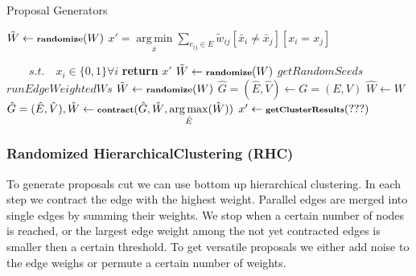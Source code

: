 \documentclass[10pt,twocolumn,letterpaper]{article}
\DeclareMathOperator*{\argmin}{arg\,min}
\DeclareMathOperator*{\argmax}{arg\,max}
\begin{document}
\begin{algorithm}
    \begin{scriptsize}
        \caption{Proposal Generators}\label{alg:proposal_gen}   
        \begin{algorithmic}[1]
            \State $\tilde{W} \gets \textbf{\scriptsize{randomize}}(W) $
            \State $x'= \argmin\limits_{\bar{x}} \sum\limits_{e_{ij} \in E } \tilde{w}_{ij}[\bar{x}_i \neq \bar{x}_j]  [x_i = x_j]   $

            $ \quad\quad s.t.\quad x_i \in \{0, 1\} \forall i $
            \State \textbf{return} $x'$
            \EndProcedure
            \vspace{0.3cm}
            \State $\tilde{W} \gets \textbf{\scriptsize{randomize}}(W) $
            \State $ getRandomSeeds$
            \State $ runEdgeWeightedWs$
            \EndProcedure   
            \vspace{0.3cm}
            \State $\tilde{W} \gets \textbf{\scriptsize{randomize}}(W) $
            \State $\hat{G}=(\hat{E},\hat{V}) \gets G=(E,V)$
            \State $\hat{W} \gets W$
                \State $\hat{G}=(\hat{E},\hat{V}),\hat{W} \gets 
                    \textbf{\scriptsize{contract}}(\hat{G},\hat{W},  \argmax\limits_{\hat{E}}(\hat{W}) )$
            \EndWhile
            \State $x' \gets \textbf{\scriptsize{getClusterResults}}(???) $ 
            \EndProcedure
        \end{algorithmic}
    \end{scriptsize}
\end{algorithm}



\subsubsection{Randomized HierarchicalClustering (RHC)}

To generate proposals cut we can use bottom up hierarchical clustering.
In each step we contract the edge with the highest weight.
Parallel edges are merged into single edges by summing their weights.
We stop when a certain number of nodes is reached, or the
largest edge weight among the not yet contracted edges is smaller then a certain threshold.
To get versatile proposals we either add noise 
to the edge weighs or permute a certain number of weights.
\end{document}
